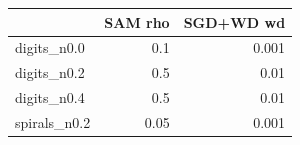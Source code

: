 \begin{tabular}{lrr}
\toprule
 & SAM rho & SGD+WD wd \\
\midrule
digits\_n0.0 & 0.1 & 0.001 \\
digits\_n0.2 & 0.5 & 0.01 \\
digits\_n0.4 & 0.5 & 0.01 \\
spirals\_n0.2 & 0.05 & 0.001 \\
\bottomrule
\end{tabular}
